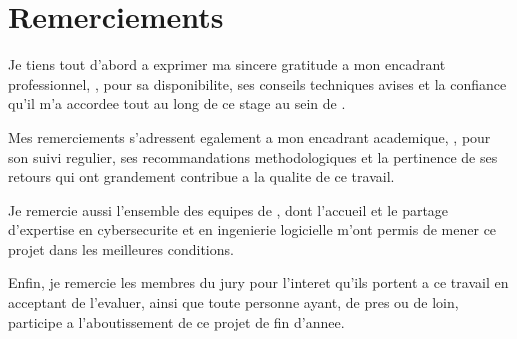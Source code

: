 \chapter*{Remerciements}

Je tiens tout d'abord a exprimer ma sincere gratitude a mon encadrant professionnel,
\encadrantpro, pour sa disponibilite, ses conseils techniques avises et la confiance
qu'il m'a accordee tout au long de ce stage au sein de \organisme.

Mes remerciements s'adressent egalement a mon encadrant academique, \encadrantacad,
pour son suivi regulier, ses recommandations methodologiques et la pertinence de ses
retours qui ont grandement contribue a la qualite de ce travail.

Je remercie aussi l'ensemble des equipes de \organisme, dont l'accueil et le partage
d'expertise en cybersecurite et en ingenierie logicielle m'ont permis de mener ce
projet dans les meilleures conditions.

Enfin, je remercie les membres du jury pour l'interet qu'ils portent a ce travail en
acceptant de l'evaluer, ainsi que toute personne ayant, de pres ou de loin, participe
a l'aboutissement de ce projet de fin d'annee.

\clearpage
